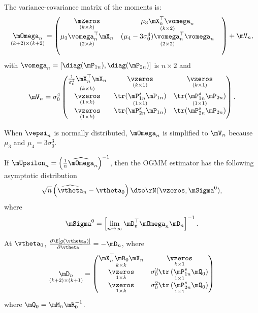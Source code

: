 The variance-covariance matrix of the moments is:
\begin{equation*}
\underset{(k + 2) \times (k+2)}{\mOmega_n} = \begin{pmatrix}
\underset{(k \times k)}{\mZeros} & \underset{(k \times 2)}{\mu_3 \mX_n^\top\vomega_n} \\
              \underset{(2 \times k)}{\mu_3\vomega^\top_n\mX_n}  & \underset{(2 \times 2)}{(\mu_4 - 3\sigma_0^4)\vomega_n^\top\vomega_n} & \\
               & 
            \end{pmatrix}
             + 
             \mV_n,
\end{equation*}
%
with $\vomega_n = \left[\diag(\mP_{1n}), \diag(\mP_{2n})\right]$ is $n\times 2$ and 
\begin{equation*}
  \mV_n = \sigma_0^4
          \begin{pmatrix}
          \underset{(k\times k)}{\frac{1}{\sigma_0^2}\mX_n^\top\mX_n} & \underset{(k\times 1)}{\vzeros} & \underset{(k\times 1)}{\vzeros} \\
          \underset{(1\times k)}{\vzeros}
          & \underset{(1\times 1)}{\tr(\mP_{1n}^s\mP_{1n})} & \underset{(1\times 1)}{\tr(\mP_{1n}^s\mP_{2n})}  \\
          \underset{(1\times k)}{\vzeros} &
          \tr(\mP_{2n}^s\mP_{1n}) & \tr(\mP_{2n}^s\mP_{2n})
          \end{pmatrix}.
\end{equation*}

When $\vepsi_n$ is normally distributed, $\mOmega_n$ is simplified to $\mV_n$ because $\mu_3$ and $\mu_4 = 3\sigma_0^3$.

If $\mUpsilon_n = \left(\frac{1}{n}\widehat{\mOmega}_n\right)^{-1}$, then the OGMM estimator has the following asymptotic distribution
\begin{equation*}
\sqrt{n}\left(\widehat{\vtheta}_n - \vtheta_0\right)\dto \rN(\vzeros, \mSigma^0),
\end{equation*}
%
where
\begin{equation*}
\mSigma^0 = \left[\lim_{n\to\infty}\mD_n^\top\mOmega_n\mD_n\right]^{-1}.
\end{equation*}

At $\vtheta_0$, $\frac{\partial \E\left[g(\vtheta_0)\right]}{\partial \vtheta^\top} = - \mD_n$, where
\begin{equation}\label{eq:D-gmm-sem}
\underset{(k + 2)\times (k + 1)}{\mD_n} = 
\begin{pmatrix}
  \underset{k\times k}{\mX_n^\top\mR_0\mX_n} & \underset{k\times 1}{\vzeros} \\
  \underset{1 \times k}{\vzeros} & \underset{1\times 1}{\sigma_0^2 \tr\left(\mP_{1n}^{s}\mQ_0\right)}\\
  \underset{1\times k}{\vzeros} & \underset{1\times 1}{\sigma_0^2 \tr\left(\mP_{2n}^{s}\mQ_0\right)}
\end{pmatrix}
\end{equation}
%
where $\mQ_0 = \mM_n\mR_0^{-1}$. 

